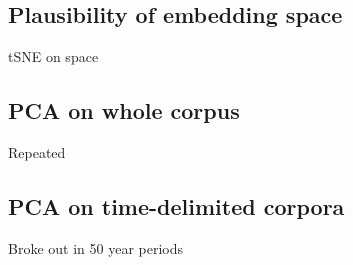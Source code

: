 \subsection{Plausibility of embedding space}
tSNE on space
\subsection{PCA on whole corpus}
Repeated 
\subsection{PCA on time-delimited corpora}
Broke out in 50 year periods
